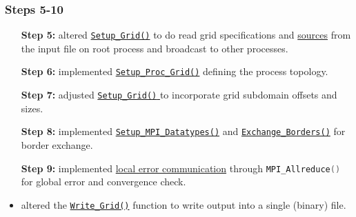 \subsubsection{Steps 5-10}
\begin{itemize}
    \item [\textbf{Step 5:}] altered 
    \href{https://github.com/PhilipSoliman/hpc-labs/blob/b16da8d7ee717657e13c316369fa0996da7816cc/assignment_1/ppoisson2.c#L196-L215}{\lstinline|Setup_Grid()|} 
    to do read grid specifications and
    \href{https://github.com/PhilipSoliman/hpc-labs/blob/b16da8d7ee717657e13c316369fa0996da7816cc/assignment_1/ppoisson2.c#L255-L281}{sources}
    from the input file on root process and broadcast to other processes.
    \item [\textbf{Step 6:}] implemented 
    \href{https://github.com/PhilipSoliman/hpc-labs/blob/b16da8d7ee717657e13c316369fa0996da7816cc/assignment_1/ppoisson2.c#L289}{\lstinline|Setup_Proc_Grid()|}
    defining the process topology.
    \item [\textbf{Step 7:}] adjusted 
    \href{https://github.com/PhilipSoliman/hpc-labs/blob/b16da8d7ee717657e13c316369fa0996da7816cc/assignment_1/ppoisson2.c#L218-L229}{\lstinline|Setup_Grid()| }
    to incorporate grid subdomain offsets and sizes.
    \item [\textbf{Step 8:}] implemented 
    \href{https://github.com/PhilipSoliman/hpc-labs/blob/b16da8d7ee717657e13c316369fa0996da7816cc/assignment_1/ppoisson2.c#L1063}{\lstinline|Setup_MPI_Datatypes()|}
    and 
    \href{https://github.com/PhilipSoliman/hpc-labs/blob/b16da8d7ee717657e13c316369fa0996da7816cc/assignment_1/ppoisson2.c#L1137-L1144}{\lstinline|Exchange_Borders()|}
    for border exchange.
    \item [\textbf{Step 9:}] implemented 
    \href{https://github.com/PhilipSoliman/hpc-labs/blob/b16da8d7ee717657e13c316369fa0996da7816cc/assignment_1/ppoisson2.c#L637}{local error communication} 
    through \lstinline[language=C]{MPI_Allreduce()} for global error and convergence check.
    \item [\textbf{Step 10:}] altered the
    \href{https://github.com/PhilipSoliman/hpc-labs/blob/b16da8d7ee717657e13c316369fa0996da7816cc/assignment_1/ppoisson2.c#L665}{\lstinline|Write_Grid()|}
    function to write output into a single (binary) file.
\end{itemize}

